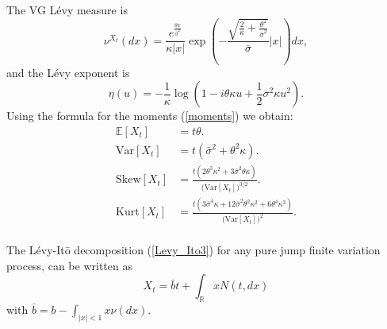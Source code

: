 \documentclass[a4paper,10pt]{article}
\newcommand{\numberset}{\mathbb}
\newcommand{\R}{\numberset{R}}
\newcommand{\E}{\numberset{E}}
\begin{document}
The VG Lévy measure is
\begin{equation}\label{VG_measure}
 \nu^{X_t}(dx) = \frac{e^{\frac{\theta x}{\bar\sigma^2}}}{\kappa|x|} \exp 
 \left( - \frac{\sqrt{\frac{2}{\kappa} + \frac{\theta^2}{\bar\sigma^2}}}{\bar\sigma} |x|\right) dx,
\end{equation}
and the Lévy exponent is 
\begin{equation}
 \eta(u) = -\frac{1}{\kappa} \log(1-i\theta \kappa u + \frac{1}{2} \bar\sigma^2 \kappa u^2).
\end{equation}
Using the formula for the moments (\ref{moments}) we obtain:
\begin{align}\label{VG_cumulants}
 \E[X_t] &= t\theta. \\ \nonumber
 \mbox{Var}[X_t] &= t(\bar\sigma^2 + \theta^2 \kappa). \\ \nonumber
 \mbox{Skew}[X_t] &= \frac{t (2\theta^3\kappa^2 + 3 \bar\sigma^2 \theta \kappa)}{\bigl(\mbox{Var}[X_t])^{3/2}}. \\ \nonumber
 \mbox{Kurt}[X_t] &= \frac{t (3\bar\sigma^4 \kappa + 12\bar\sigma^2 \theta^2 \kappa^2 +6\theta^4\kappa^3)}{\bigl(\mbox{Var}[X_t]\bigr)^2}.\nonumber 
\end{align}
\\
The Lévy-It\={o} decomposition (\ref{Levy_Ito3}) for any pure jump finite variation process, 
can be written as
\begin{equation}\label{Levy_Ito4}
X_t = \bar b t + \int_{\R} x N(t,dx) 
\end{equation}
with $\bar b = b - \int_{|x|<1} x \nu(dx)$. 
\end{document}
